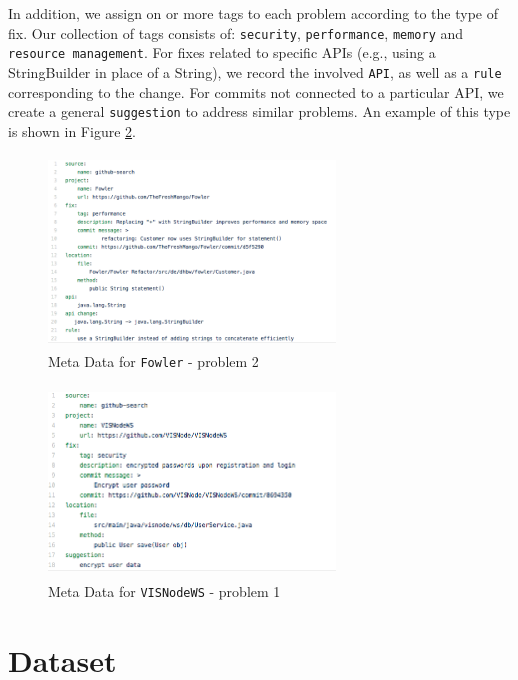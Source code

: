 \documentclass[sigconf]{acmart}
\begin{document}
In addition, we assign on or more tags to each problem according to the type of fix. Our collection of tags consists of: \texttt{security}, \texttt{performance}, \texttt{memory}  and \texttt{resource management}. For fixes related to specific APIs (e.g., using a StringBuilder in place of  a String), we record the involved \texttt{API}, as well as a \texttt{rule} corresponding to the change. For commits not connected to a particular API, we create a general \texttt{suggestion} to address similar problems. An example of this type is shown in Figure \ref{fig:meta2}. 

\begin{figure}
  \includegraphics[height=2in, width=3in]{YAMLmetadata}
  \caption{Meta Data for \texttt{Fowler} - problem 2}
  \label{fig:meta1}
\end{figure}


\begin{figure}
  \includegraphics[height=2in, width=3in]{YAMLmetadata2}
  \caption{Meta Data for \texttt{VISNodeWS} - problem 1}
  \label{fig:meta2}
\end{figure}

\section{Dataset}
\end{document}
